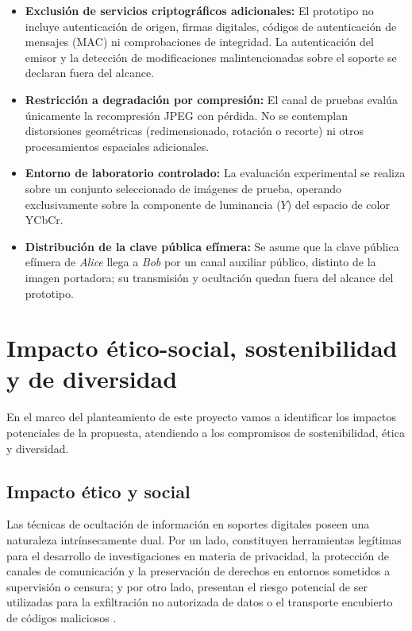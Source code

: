 \documentclass[IB]{TFUOC}%
\begin{document}
\begin{itemize}
    \item \textbf{Exclusión de servicios criptográficos adicionales:} El prototipo no incluye autenticación de origen, firmas digitales, códigos de autenticación de mensajes ($\mathrm{MAC}$) ni comprobaciones de integridad. La autenticación del emisor y la detección de modificaciones malintencionadas sobre el soporte se declaran fuera del alcance.
    \item \textbf{Restricción a degradación por compresión:} El canal de pruebas evalúa únicamente la recompresión JPEG con pérdida. No se contemplan distorsiones geométricas (redimensionado, rotación o recorte) ni otros procesamientos espaciales adicionales.
    \item \textbf{Entorno de laboratorio controlado:} La evaluación experimental se realiza sobre un conjunto seleccionado de imágenes de prueba, operando exclusivamente sobre la componente de luminancia ($Y$) del espacio de color YCbCr.
    \item \textbf{Distribución de la clave pública efímera:} Se asume que la clave pública efímera de \textit{Alice} llega a \textit{Bob} por un canal auxiliar público, distinto de la imagen portadora; su transmisión y ocultación quedan fuera del alcance del prototipo.
\end{itemize}

\section{Impacto ético-social, sostenibilidad y de diversidad}
\label{s:etic}


En el marco del planteamiento de este proyecto vamos a identificar los impactos potenciales de la propuesta, atendiendo a los compromisos de sostenibilidad, ética y diversidad.

\subsection{Impacto ético y social}
\label{subsec:impacto_etico_social}

Las técnicas de ocultación de información en soportes digitales poseen una naturaleza intrínsecamente dual. Por un lado, constituyen herramientas legítimas para el desarrollo de investigaciones en materia de privacidad, la protección de canales de comunicación y la preservación de derechos en entornos sometidos a supervisión o censura; y por otro lado, presentan el riesgo potencial de ser utilizadas para la exfiltración no autorizada de datos o el transporte encubierto de códigos maliciosos \cite{21}.
\end{document}
